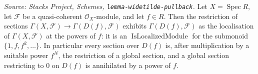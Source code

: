 \begin{lemma}
  \label{mk-lem:qcoh_localized_sections}

  \textit{Source: Stacks Project, Schemes, \texttt{lemma-widetilde-pullback}.}
  Let \(X = \operatorname{Spec} R\), let \(\mathcal{F}\) be a quasi-coherent
  \(\mathcal{O}_X\)-module, and let \(f \in R\). Then the restriction of sections
  \(\Gamma(X, \mathcal{F}) \to \Gamma(D(f), \mathcal{F})\) exhibits
  \(\Gamma(D(f), \mathcal{F})\) as the localisation of \(\Gamma(X, \mathcal{F})\) at the
  powers of \(f\): it is an \(\operatorname{IsLocalizedModule}\) for the submonoid
  \(\{1, f, f^2, \ldots\}\). In particular every section over \(D(f)\) is, after
  multiplication by a suitable power \(f^N\), the restriction of a global section, and a
  global section restricting to \(0\) on \(D(f)\) is annihilated by a power of \(f\).
\end{lemma}
